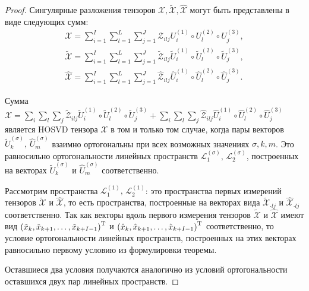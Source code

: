 \documentclass[specialist,
    substylefile = spbu.rtx,
    subf,href,colorlinks=true, 12pt]{disser}
\theoremstyle{plain}
\theoremstyle{definition}
\theoremstyle{remark}
\begin{document}
    \begin{proof}
        Сингулярные разложения тензоров $\mathcal{X}, \widetilde{\mathcal{X}}, \widehat{\mathcal{X}}$ 
        могут быть представлены в виде
        следующих сумм:
        \[
            \begin{aligned}
                \mathcal{X}=\sum_{i=1}^{I} \sum_{l=1}^{L} \sum_{j=1}^{J} \mathcal{Z}_{ilj} U^{(1)}_{i}
                \circ U^{(2)}_{l} \circ U^{(3)}_{j},\\
                \widetilde{\mathcal{X}}=\sum_{i=1}^{I} \sum_{l=1}^{L} \sum_{j=1}^{J} \widetilde{\mathcal{Z}}_{ilj}
                \widetilde{U}^{(1)}_{i} \circ \widetilde{U}^{(2)}_{l} \circ \widetilde{U}^{(3)}_{j},\\
                \widehat{\mathcal{X}}=\sum_{i=1}^{I} \sum_{l=1}^{L} \sum_{j=1}^{J} \widehat{\mathcal{Z}}_{ilj}
                \widehat{U}^{(1)}_{i} \circ \widehat{U}^{(2)}_{l} \circ \widehat{U}^{(3)}_{j}.
            \end{aligned}
        \]

        Сумма $\mathcal{X} = \sum_{i} \sum_{l} \sum_{j} \tilde{\mathcal{Z}}_{ilj}
        \widetilde{U}^{(1)}_{i} \circ \widetilde{U}^{(2)}_{l} \circ \widetilde{U}^{(3)}_{j} +
        \sum_{i} \sum_{l} \sum_{j} \widehat{\mathcal{Z}}_{ilj} \widehat{U}^{(1)}_{i} \circ \widehat{U}^{(2)}_{l}
        \circ \widehat{U}^{(3)}_{j}$ является HOSVD тензора $\mathcal{X}$ в том и только том случае, когда
        пары векторов $\widetilde{U}^{(\sigma)}_{k},\, \widehat{U}^{(\sigma)}_{m}$ взаимно ортогональны
        при всех возможных значениях $\sigma, k, m$.
        Это равносильно ортогональности линейных пространств $\mathcal{L}^{(\sigma)}_{1},\, \mathcal{L}^{(\sigma)}_{2}$,
        построенных на векторах $\widetilde{U}^{(\sigma)}_{k}$ и $\widehat{U}^{(\sigma)}_{m}$ соответственно.

        Рассмотрим пространства $\mathcal{L}^{(1)}_{1},\, \mathcal{L}^{(1)}_{2}$: это пространства первых измерений
        тензоров $\widetilde{\mathcal{X}}$ и $\widehat{\mathcal{X}}$, то есть пространства, построенные на векторах вида
        $\widetilde{\mathcal{X}}_{\cdot lj}$ и $\widehat{\mathcal{X}}_{\cdot lj}$ соответственно.
        Так как векторы вдоль первого измерения тензоров $\widetilde{\mathcal{X}}$ и $\widehat{\mathcal{X}}$
        имеют вид \linebreak $\left(\tilde{x}_k, \tilde{x}_{k+1}, \ldots, \tilde{x}_{k+I-1}\right)^{\mathrm{T}}$ и 
        $\left(\hat{x}_k, \hat{x}_{k+1}, \ldots, \hat{x}_{k+I-1}\right)^{\mathrm{T}}$ соответственно,
        то условие ортогональности линейных пространств, построенных на этих векторах 
        равносильно первому условию из формулировки теоремы.

        Оставшиеся два условия получаются аналогично из условий ортогональности оставшихся двух пар линейных пространств.
    \end{proof}
\end{document}
